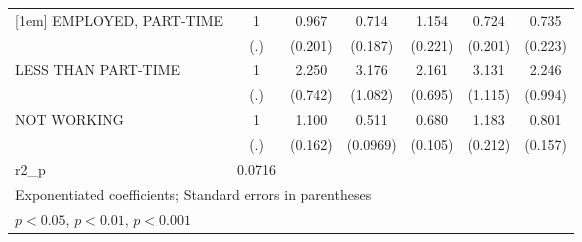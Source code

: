 {\begin{tabular}{l*{6}{c}}
[1em]
EMPLOYED, PART-TIME           &         1         &     0.967         &     0.714         &     1.154         &     0.724         &     0.735         \\
                              &       (.)         &   (0.201)         &   (0.187)         &   (0.221)         &   (0.201)         &   (0.223)         \\
[1em]
LESS THAN PART-TIME           &         1         &     2.250\sym{*}  &     3.176\sym{***}&     2.161\sym{*}  &     3.131\sym{**} &     2.246         \\
                              &       (.)         &   (0.742)         &   (1.082)         &   (0.695)         &   (1.115)         &   (0.994)         \\
[1em]
NOT WORKING                   &         1         &     1.100         &     0.511\sym{***}&     0.680\sym{*}  &     1.183         &     0.801         \\
                              &       (.)         &   (0.162)         &  (0.0969)         &   (0.105)         &   (0.212)         &   (0.157)         \\
\hline
r2\_p                          &    0.0716         &                   &                   &                   &                   &                   \\
\hline\hline
\multicolumn{7}{l}{\footnotesize Exponentiated coefficients; Standard errors in parentheses}\\
\multicolumn{7}{l}{\footnotesize \sym{*} \(p<0.05\), \sym{**} \(p<0.01\), \sym{***} \(p<0.001\)}\\
\end{tabular}
}
